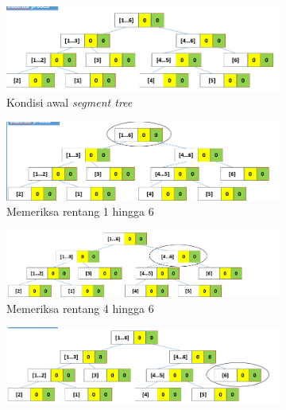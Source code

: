\begin{figure}[H]
	\vspace{-1.2cm}
	\begin{subfigure}{1.0\textwidth}
		\centering
		\includegraphics[scale=0.32]{assets/images/Ilustrasi_proses_5.PNG}
		\caption{Kondisi awal \textit{segment tree}}
		\label{fig:subproses5}
	\end{subfigure}
	\begin{subfigure}{1.0\textwidth}
		\centering
		\includegraphics[scale=0.32]{assets/images/Ilustrasi_proses_6.PNG}
		\caption{Memeriksa rentang 1 hingga 6}
		\label{fig:subproses6}
	\end{subfigure}
	\begin{subfigure}{1.0\textwidth}
		\centering
		\includegraphics[scale=0.32]{assets/images/Ilustrasi_proses_7.PNG}
		\caption{Memeriksa rentang 4 hingga 6}
		\label{fig:subproses7}
	\end{subfigure}
	\begin{subfigure}{1.0\textwidth}
		\centering
		\includegraphics[scale=0.32]{assets/images/Ilustrasi_proses_8.PNG}

\end{subfigure}
\end{figure}
